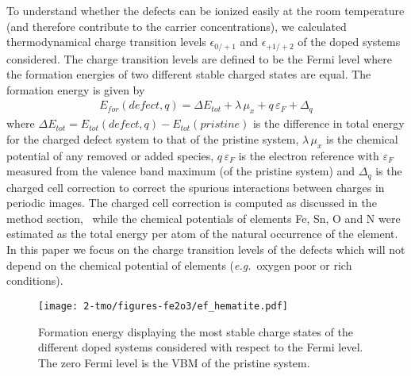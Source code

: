 To understand whether the defects can be ionized easily at the room temperature (and therefore contribute to the carrier concentrations), we calculated thermodynamical charge transition levels $\epsilon_{0/+1}$ and $\epsilon_{+1/+2}$ of the doped systems considered. The charge transition levels are defined to be the Fermi level where the formation energies of two different stable charged states are equal. The formation energy is given by
\begin{align}
E_{for}(defect,q) = \Delta E_{tot} +\lambda\,\mu_x+q\,\varepsilon_{F}+\Delta_q \label{fe2o3:eq:ef}
\end{align}
where $\Delta E_{tot} = E_{tot}(defect,q)-E_{tot}(pristine)$ is the difference in total energy for the charged defect system to that of the pristine system, $\lambda\,\mu_x$ is the chemical potential of any removed or added species, $q\,\varepsilon_{F}$ is the electron reference with $\varepsilon_{F}$ measured from the valence band maximum (of the pristine system) and $\Delta_q$ is the charged cell correction to correct the spurious interactions between charges in periodic images. The charged cell correction is computed as discussed in the method section,~\cite{PING2017JCP} while the chemical potentials of elements Fe, Sn, O and N were estimated as the total energy per atom of the natural occurrence of the element. In this paper we focus on the charge transition levels of the defects which will not depend on the chemical potential of elements (\textit{e.g.}\ oxygen poor or rich conditions).



\begin{figure}[t!]
\begin{center}
\texttt{[image: 2-tmo/figures-fe2o3/ef\_hematite.pdf]} %
\end{center}
\caption{Formation energy displaying the most stable charge states of the different doped systems considered with respect to the Fermi level. The zero Fermi level is the VBM of the pristine system.} \label{fe2o3:fig:ef}
\end{figure}



